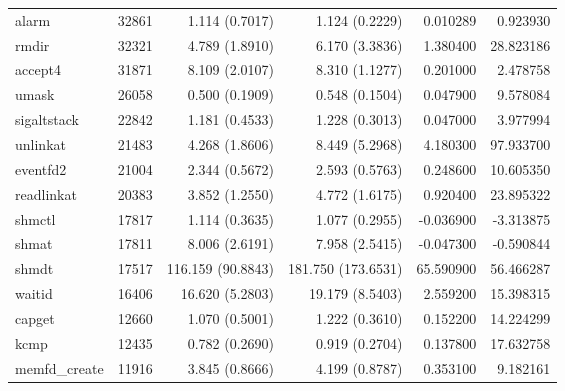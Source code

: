 \begin{longtable}{>{\ttfamily}lrrrrr}
                          alarm &       32861 &           1.114 (0.7017) &           1.124 (0.2229) &        0.010289 &     0.923930 \\
                          rmdir &       32321 &           4.789 (1.8910) &           6.170 (3.3836) &        1.380400 &    28.823186 \\
                        accept4 &       31871 &           8.109 (2.0107) &           8.310 (1.1277) &        0.201000 &     2.478758 \\
                          umask &       26058 &           0.500 (0.1909) &           0.548 (0.1504) &        0.047900 &     9.578084 \\
                    sigaltstack &       22842 &           1.181 (0.4533) &           1.228 (0.3013) &        0.047000 &     3.977994 \\
                       unlinkat &       21483 &           4.268 (1.8606) &           8.449 (5.2968) &        4.180300 &    97.933700 \\
                       eventfd2 &       21004 &           2.344 (0.5672) &           2.593 (0.5763) &        0.248600 &    10.605350 \\
                     readlinkat &       20383 &           3.852 (1.2550) &           4.772 (1.6175) &        0.920400 &    23.895322 \\
                         shmctl &       17817 &           1.114 (0.3635) &           1.077 (0.2955) &       -0.036900 &    -3.313875 \\
                          shmat &       17811 &           8.006 (2.6191) &           7.958 (2.5415) &       -0.047300 &    -0.590844 \\
                          shmdt &       17517 &        116.159 (90.8843) &       181.750 (173.6531) &       65.590900 &    56.466287 \\
                         waitid &       16406 &          16.620 (5.2803) &          19.179 (8.5403) &        2.559200 &    15.398315 \\
                         capget &       12660 &           1.070 (0.5001) &           1.222 (0.3610) &        0.152200 &    14.224299 \\
                           kcmp &       12435 &           0.782 (0.2690) &           0.919 (0.2704) &        0.137800 &    17.632758 \\
                  memfd\_create &       11916 &           3.845 (0.8666) &           4.199 (0.8787) &        0.353100 &     9.182161 \\

\end{longtable}
